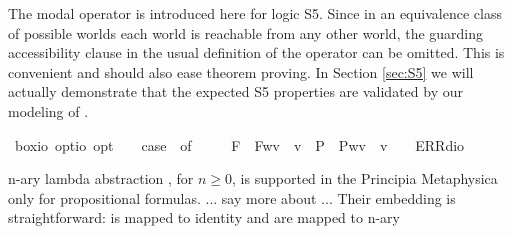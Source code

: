\begin{isabellebody}
%
\isadelimproof
%
\endisadelimproof
%
\isatagproof
%
\endisatagproof
{\isafoldproof}%
%
\isadelimproof
%
\endisadelimproof
%
\isadelimproof
%
\endisadelimproof
%
\isatagproof
%
\endisatagproof
{\isafoldproof}%
%
\isadelimproof
%
\endisadelimproof
%
\begin{isamarkuptext}%
The modal \isa{\isactrlbold {\isasymbox}} operator is introduced here for logic S5. Since in an equivalence class
 of possible worlds each world is reachable from any other world, the guarding accessibility clause
 in the usual definition of the \isa{\isactrlbold {\isasymbox}} operator can be omitted. This is convenient and should also
 ease theorem proving. In Section \ref{sec:S5} we will actually demonstrate that the expected S5 properties
 are validated by our modeling of \isa{\isactrlbold {\isasymbox}}.%
\end{isamarkuptext}%
\isamarkuptrue%
\isamarkupfalse%
\ box{\isacharcolon}{\isacharcolon}{\isachardoublequoteopen}io\ opt{\isasymRightarrow}io\ opt{\isachardoublequoteclose}{\isacharparenleft}{\isachardoublequoteopen}\isactrlbold {\isasymbox}{\isachardoublequoteclose}{\isacharparenright}\ \ {\isachardoublequoteopen}\isactrlbold {\isasymbox}{\isasymphi}\ {\isasymequiv}\ case\ {\isasymphi}\ of\ \isanewline
\ \ \ \ F{\isacharparenleft}{\isasympsi}{\isacharparenright}\ {\isasymRightarrow}\ F{\isacharparenleft}{\isasymlambda}w{\isachardot}{\isasymforall}v{\isachardot}\ {\isasympsi}\ v{\isacharparenright}\ {\isacharbar}\ P{\isacharparenleft}{\isasympsi}{\isacharparenright}\ {\isasymRightarrow}\ P{\isacharparenleft}{\isasymlambda}w{\isachardot}{\isasymforall}v{\isachardot}\ {\isasympsi}\ v{\isacharparenright}\ {\isacharbar}\ {\isacharunderscore}\ {\isasymRightarrow}\ ERR{\isacharparenleft}dio{\isacharparenright}{\isachardoublequoteclose}%
\begin{isamarkuptext}%
n-ary lambda abstraction , for $n\geq 0$, is supported in the Principia
 Metaphysica only for propositional formulas. ... say more about  ... Their embedding is 
 straightforward:  is mapped to identity and  are mapped to n-ary

\end{isamarkuptext}
\end{isabellebody}
